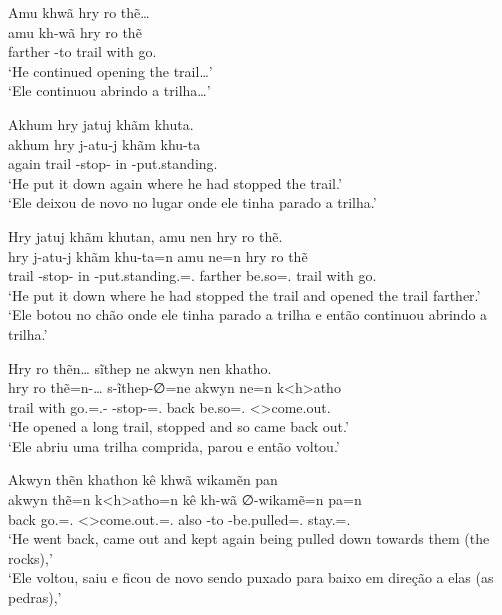 \documentclass[output=paper,
modfonts,nonflat
]{langsci/langscibook}
\begin{document}
\ea  Amu khwã hry ro thẽ\ldots{} \\[.3em]
\gll amu     kh-wã     hry   ro   thẽ      \\
     farther \Third-to trail with go.\Sg{} \\
\glt `He continued opening the trail\ldots{}' \\
     `Ele continuou abrindo a trilha\ldots{}' \\
\z

\ea  Akhum hry jatuj khãm khuta. \\[.3em]
\gll akhum hry   j-atu-j         khãm khu-ta                    \\
     again trail \E-stop-\Nmlz{} in   \Third-put.standing.\Sg{} \\
\glt `He put it down again where he had stopped the trail.' \\
     `Ele deixou de novo no lugar onde ele tinha parado a trilha.' \\
\z

\ea  Hry jatuj khãm khutan, amu nen hry ro thẽ. \\[.3em]
\gll hry   j-atu-j         khãm khu-ta=n                           amu     ne=n             hry   ro   thẽ      \\
     trail \E-stop-\Nmlz{} in   \Third-put.standing.\Sg=\AAnd.\Ss{} farther be.so=\AAnd.\Ss{} trail with go.\Sg{} \\
\glt `He put it down where he had stopped the trail and opened the trail farther.' \\
     `Ele botou no chão onde ele tinha parado a trilha e então continuou abrindo a trilha.' \\
\z

\ea  Hry ro thẽn\ldots{} sĩthep ne akwyn nen khatho. \\[.3em]
\gll hry   ro   thẽ=n-\ldots{}             s-ĩthep-∅=ne                   akwyn ne=n             k<h>atho               \\
     trail with go.\Sg=\AAnd.\Ss{}-\Ints{} \Third-stop-\Nmlz{}=\AAnd.\Ss{} back  be.so=\AAnd.\Ss{} <\Third>come.out.\Sg{} \\
\glt `He opened a long trail, stopped and so came back out.' \\
     `Ele abriu uma trilha comprida, parou e então voltou.' \\
\z

\ea  Akwyn thẽn khathon kê khwã wikamẽn pan \\[.3em]
\gll akwyn thẽ=n             k<h>atho=n                      kê   kh-wã     ∅-wikamẽ=n                  pa=n                \\
     back  go.\Sg=\AAnd.\Ss{} <\Third>come.out.\Sg=\AAnd.\Ss{} also \Third-to \Third-be.pulled=\AAnd.\Ss{} stay.\Pl=\AAnd.\Ss{} \\
\glt `He went back, came out and kept again being pulled down towards them (the rocks),' \\
     `Ele voltou, saiu e ficou de novo sendo puxado para baixo em direção a elas (as pedras),' \\
\z
\end{document}
